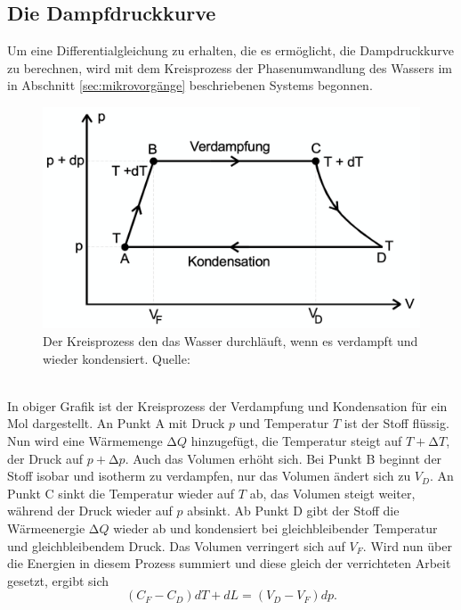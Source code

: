   \subsection{Die Dampfdruckkurve}
  \label{sec:dampfdruckkurve}
    Um eine Differentialgleichung zu erhalten, die es ermöglicht, die Dampdruckkurve zu berechnen, wird mit dem
    Kreisprozess der Phasenumwandlung des Wassers im in Abschnitt \ref{sec:mikrovorgänge} beschriebenen Systems begonnen.
    \\
    \begin{figure}
      \centering
        \label{fig:kreisprozess}
          \includegraphics[scale=0.2]{Content/kreisprozess.png}
          \caption{Der Kreisprozess den das Wasser durchläuft, wenn es verdampft und wieder kondensiert. Quelle: \cite{AP01}}
    \end{figure}
    \\
    \noindent
    In obiger Grafik ist der Kreisprozess der Verdampfung und Kondensation für ein Mol dargestellt. An Punkt A mit Druck $p$ und
    Temperatur $T$ ist der Stoff flüssig. Nun wird eine Wärmemenge $\increment Q$ hinzugefügt, die Temperatur steigt auf
    $T + \increment T$, der Druck auf $p + \increment p$. Auch das Volumen erhöht sich. Bei Punkt B beginnt der Stoff isobar
    und isotherm zu verdampfen, nur das Volumen ändert sich zu $V_{D}$. An Punkt C sinkt die Temperatur wieder auf $T$ ab, das
    Volumen steigt weiter, während der Druck wieder auf $p$ absinkt. Ab Punkt D gibt der Stoff die Wärmeenergie $\increment Q$
    wieder ab und kondensiert bei gleichbleibender Temperatur und gleichbleibendem Druck. Das Volumen verringert sich auf
    $V_{F}$.
    Wird nun über die Energien in diesem Prozess summiert und diese gleich der verrichteten Arbeit gesetzt, ergibt sich
    \begin{equation*}
      \label{eqn:wärmeenergiearbeit}
      (C_{F} - C_{D})dT + dL = (V_{D} - V_{F})dp.
    \end{equation*}
